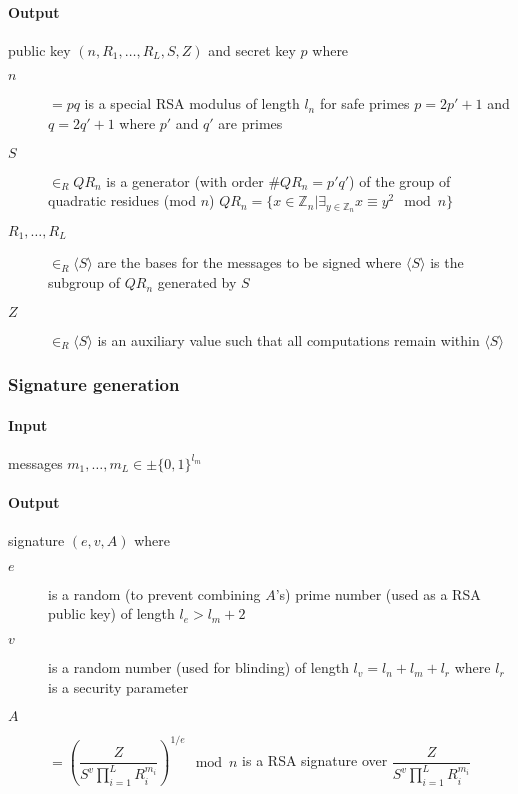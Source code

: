 \paragraph{Output}
  public key $(n, R_1, \dots, R_L, S, Z)$ and
  secret key $p$ where
\begin{description}
  \item[$n$] $= pq$ is a special RSA modulus of length $l_n$ for safe primes
    $p = 2p' + 1$ and $q = 2q' + 1$ where $p'$ and $q'$ are primes
  \item[$S$] $\in_R QR_n$ is a generator (with order $\#QR_n = p'q'$) of the
    group of quadratic residues (mod $n$)
    $QR_n = \{x \in \mathbb{Z}_n | \exists_{y \in \mathbb{Z}_n} x \equiv y^2 \mod n \}$
  \item[$R_1, \dots, R_L$] $\in_R \langle S \rangle$ are the bases for the
    messages to be signed where $\langle S \rangle$ is the subgroup of $QR_n$
    generated by $S$
  \item[$Z$] $\in_R \langle S \rangle$ is an auxiliary value such that all
    computations remain within $\langle S \rangle$
\end{description}

\subsubsection{Signature generation}\label{sec:cl_basic-sign}

\paragraph{Input} messages $m_1, \dots, m_L \in \pm \{0,1\}^{l_m}$

\paragraph{Output} signature $(e, v, A)$ where
\begin{description}
  \item[$e$] is a random (to prevent combining $A$'s) prime number (used as a RSA public key) of length $l_e > l_m + 2$
  \item[$v$] is a random number (used for blinding) of length $l_v = l_n + l_m + l_r$ where $l_r$ is a security parameter
  \item[$A$] $=\left(\dfrac{Z}{S^v \prod_{i=1}^{L} R_i^{m_i}} \right)^{1/e} \mod n$ is a RSA signature over $\dfrac{Z}{S^v \prod_{i=1}^{L} R_i^{m_i}}$
\end{description}

